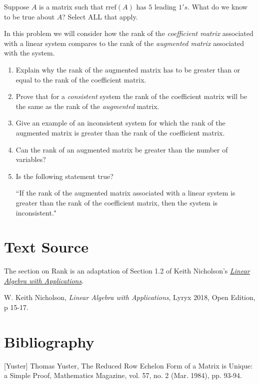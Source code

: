 \documentclass{ximera}
\begin{document}
\begin{problem}\label{prob:leadones}
Suppose $A$ is a matrix such that $\mbox{rref}(A)$ has $5$ leading $1's$.  What do we know to be true about $A$?  Select ALL that apply.
\begin{selectAll}
 \end{selectAll}
\end{problem}

\begin{problem}\label{prob:rankaugvscoeff}
In this problem we will consider how the rank of the {\it coefficient matrix} associated with a linear system compares to the rank of the {\it augmented matrix} associated with the system.  
\begin{enumerate}
\item Explain why the rank of the augmented matrix has to be greater than or equal to the rank of the coefficient matrix.
    \item Prove that for a {\it consistent} system the rank of the coefficient matrix will be the same as the rank of the {\it augmented} matrix.
    \item Give an example of an inconsistent system for which the rank of the augmented matrix is greater than the rank of the coefficient matrix.
    \item Can the rank of an augmented matrix be greater than the number of variables?
    \item Is the following statement true?
    
    ``If the rank of the augmented matrix associated with a linear system is greater than the rank of the coefficient matrix, then the system is inconsistent."
\end{enumerate}
\end{problem}

\section*{Text Source}
The section on Rank is an adaptation of Section 1.2 of Keith Nicholson's \href{https://open.umn.edu/opentextbooks/textbooks/linear-algebra-with-applications}{\it Linear Algebra with Applications}.

W. Keith Nicholson, {\it Linear Algebra with Applications}, Lyryx 2018, Open Edition, p 15-17.

\section*{Bibliography}

[Yuster] Thomas Yuster, The Reduced Row Echelon Form of a Matrix is Unique: a
Simple Proof, Mathematics Magazine, vol. 57, no. 2 (Mar. 1984), pp. 93-94.
\end{document}
